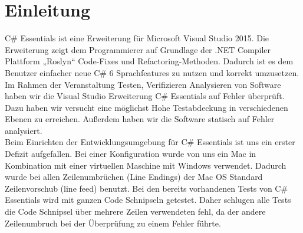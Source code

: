 \section{Einleitung}
C\# Essentials ist eine Erweiterung für Microsoft Visual Studio 2015. Die Erweiterung zeigt dem Programmierer auf Grundlage der .NET Compiler Plattform „Roslyn“ Code-Fixes und Refactoring-Methoden.
Dadurch ist es dem Benutzer einfacher neue C\# 6 Sprachfeatures zu nutzen und korrekt umzusetzen.\\
Im Rahmen der Veranstaltung \glqq Testen, Verifizieren Analysieren von Software\grqq{} haben wir die Visual Studio Erweiterung C\# Essentials auf Fehler überprüft. Dazu haben wir versucht eine möglichst Hohe Testabdeckung in verschiedenen Ebenen zu erreichen. Außerdem haben wir die Software statisch auf Fehler analysiert.\\
Beim Einrichten der Entwicklungsumgebung für C\# Essentials ist uns ein erster Defizit aufgefallen. Bei einer Konfiguration wurde von uns ein Mac in Kombination mit einer virtuellen Maschine mit Windows verwendet. Dadurch wurde bei allen Zeilenumbrüchen (Line Endings) der Mac OS Standard Zeilenvorschub (line feed) benutzt. Bei den bereits vorhandenen Tests von C\# Essentials wird mit ganzen Code Schnipseln getestet. Daher schlugen alle Tests die Code Schnipsel über mehrere Zeilen verwendeten fehl, da der andere Zeilenumbruch bei der Überprüfung zu einem Fehler führte.
